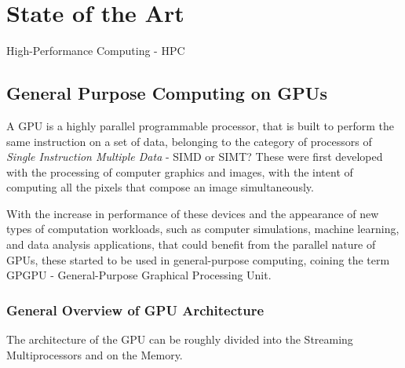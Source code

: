 
\chapter{State of the Art}
\label{chapter:stateoftheart}




High-Performance Computing - HPC


\section{General Purpose Computing on GPUs}
\label{section:gpuarch}

A GPU is a highly parallel programmable processor, that is built to perform the same instruction on a set of data, belonging to the category of processors of \textit{Single Instruction Multiple Data} - SIMD or SIMT?  These were first developed with the processing of computer graphics and images, with the intent of computing all the pixels that compose an image simultaneously. 

With the increase in performance of these devices and the appearance of new types of computation workloads, such as computer simulations, machine learning, and data analysis applications, that could benefit from the parallel nature of GPUs, these started to be used in general-purpose computing, coining the term GPGPU - General-Purpose Graphical Processing Unit.

\subsection{General Overview of GPU Architecture}

The architecture of the GPU can be roughly divided into the Streaming Multiprocessors and on the Memory.  
